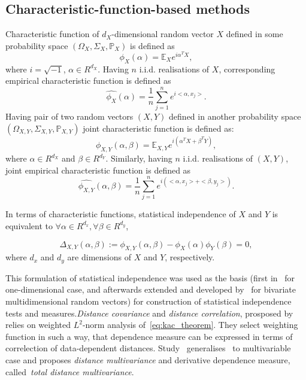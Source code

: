 \documentclass{article}
\begin{document}
\subsection{Characteristic-function-based methods}
\label{section:previous_work_cf}
Characteristic function of $d_{X}$-dimensional random vector $X$ defined in some probability space $(\Omega_{X}, \Sigma_{X}, \mathbb{P}_{X})$ is defined as 
\begin{equation}
    \label{eq:characteristic_function}
    \phi_{X}(\alpha) = \mathbb{E}_{X} e^{i\alpha^{T}X}, 
\end{equation}
where $i=\sqrt{-1}$, $\alpha \in R^{d_{X}}$. Having $n$ i.i.d. realisations of $X$, corresponding empirical characteristic function is defined as
\begin{equation}
    \label{eq:ecf}
  \widehat{\phi_{X}}(\alpha) = \frac{1}{n} \sum_{j=1}^{n} e^{i <\alpha, x_{j}>}.
\end{equation}
Having pair of two random vectors $(X,Y)$ defined in another probability space $(\Omega_{X,Y}, \Sigma_{X,Y}, \mathbb{P}_{X,Y})$  joint characteristic function is defined as:
\begin{equation}
    \label{eq:joint_characteristic_function}
    \phi_{X,Y}(\alpha,\beta) = \mathbb{E}_{X,Y} e^{i(\alpha^{T}X + \beta^{T}Y)},
\end{equation}
where $\alpha \in R^{d_{X}}$ and $\beta \in R^{d_{Y}}$. Similarly, having 
$n$ i.i.d. realisations of $(X,Y)$, joint empirical characteristic function is defined as
\begin{equation}
    \label{eq:joint_ecf}
\widehat{\phi_{X,Y}}(\alpha,\beta) = \frac{1}{n} \sum_{j=1}^{n} e^{i(<\alpha, x_{j}> + <\beta, y_{j}>) }.
\end{equation}

In terms of characteristic functions, statistical independence  of $X$ and $Y$ is equivalent to $\forall \alpha \in R^{d_x},\forall \beta \in R^{d_y} $, 

\begin{equation}
\label{eq:kac_theorem}
\Delta_{X,Y}(\alpha, \beta) := \phi_{X,Y}(\alpha,\beta) - \phi_{X}(\alpha) \phi_{Y}(\beta) = 0,
\end{equation}
where $d_{x}$ and $d_{y}$ are dimensions of $X$ and $Y$, respectively.

This formulation of statistical independence was used as the basis (first in~\cite{Feuerverger} for one-dimensional case, and afterwards extended and developed by~\cite{Szekely} for bivariate multidimensional random vectors) for construction of statistical independence tests and measures.\textit{Distance covariance} and \textit{distance correlation}, prosposed by ~\cite{Szekely} relies on weighted $L^{2}$-norm analysis of~\eqref{eq:kac_theorem}. They select weighting function in such a way, that dependence measure can be expressed in terms of correlection of data-dependent distances. Study~\cite{Bottcher} generalises~\cite{Szekely} to multivariable case and proposes \textit{distance multivariance} and derivative dependence measure, called~\textit{total distance multivariance}. 
\end{document}
